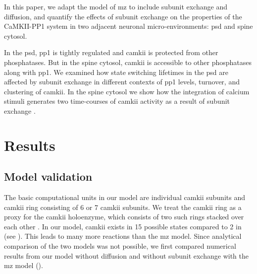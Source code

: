 \documentclass[9pt,lineno,doublespacing]{elife}
\begin{document}
In this paper, we adapt the model of \gls{mz} \citep{miller_stability_2005} to
include subunit exchange and diffusion, and quantify the effects of subunit
exchange on the properties of the CaMKII-PP1 system in two adjacent neuronal
micro-environments: \gls{psd} and spine cytosol. 

In the \gls{psd}, \gls{pp1} is tightly regulated and \gls{camkii} is protected
from other phosphatases. But in the spine cytosol, \gls{camkii} is accessible to
other phosphatases along with \gls{pp1}. We examined how state switching
lifetimes in the \gls{psd} are affected by subunit exchange in different
contexts of \gls{pp1} levels, turnover, and clustering of \gls{camkii}. In the
spine cytosol we show how the integration of calcium stimuli generates two
time-courses of \gls{camkii} activity as a result of subunit exchange
\citep{chang_camkii_2017}.

\section{Results}\label{sec:results} 

\subsection{Model validation}\label{subsec:model-validation}

The basic computational units in our model are individual \gls{camkii} subunits
and \gls{camkii} ring consisting of 6 or 7 \gls{camkii} subunits. We treat the
\gls{camkii} ring as a proxy for the \gls{camkii} holoenzyme, which consists of
two such rings stacked over each other
\citep{woodgett_calmodulin-dependent,hoelz_crystal_2003,chao_mechanism_2011}. In
our model, \gls{camkii} exists in 15 possible states compared to 2 in
\citep{miller_stability_2005} (see ). This
leads to many more reactions than the \gls{mz} model. Since analytical
comparison of the two models was not possible, we first compared numerical
results from our model without diffusion and without subunit exchange with the
\gls{mz} model ().
\end{document}
